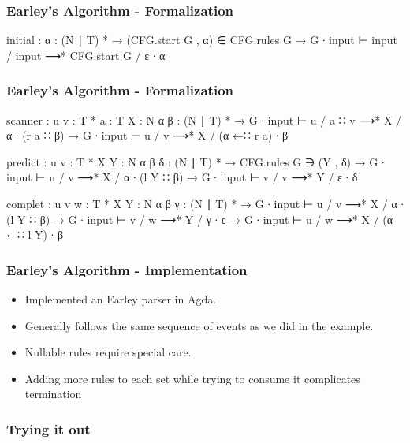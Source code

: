 \begin{frame}
	\frametitle{Earley's Algorithm - Formalization}
	\begin{code}
	  initial : {α : (N ∣ T) *} →
	    (CFG.start G , α) ∈ CFG.rules G →
	    G ∙ input ⊢ input / input ⟶* CFG.start G / ε ∙ α
	\end{code}
\end{frame}

\begin{frame}
	\frametitle{Earley's Algorithm - Formalization}
	\begin{code}
	  scanner : {u v : T *} {a : T} {X : N} {α β : (N ∣ T) *} →
	    G ∙ input ⊢ u / a ∷ v ⟶* X / α ∙ (r a ∷ β) →
	    G ∙ input ⊢ u / v ⟶* X / (α ←∷ r a) ∙ β

	  predict : {u v : T *} {X Y : N} {α β δ : (N ∣ T) *} →
	    CFG.rules G ∋ (Y , δ) →
	    G ∙ input ⊢ u / v ⟶* X / α ∙ (l Y ∷ β) →
	    G ∙ input ⊢ v / v ⟶* Y / ε ∙ δ

	  complet : {u v w : T *} {X Y : N} {α β γ : (N ∣ T) *} →
	    G ∙ input ⊢ u / v ⟶* X / α ∙ (l Y ∷ β) →
	    G ∙ input ⊢ v / w ⟶* Y / γ ∙ ε →
	    G ∙ input ⊢ u / w ⟶* X / (α ←∷ l Y) ∙ β
	\end{code}
\end{frame}

\begin{frame}
	\frametitle{Earley's Algorithm - Implementation}
	\begin{itemize}
		\item Implemented an Earley parser in Agda.
		\item Generally follows the same sequence of events as we did in the 
			example.
		\item Nullable rules require special care.
		\item Adding more rules to each set while trying to consume it
			complicates termination
	\end{itemize}
\end{frame}

\begin{frame}
	\frametitle{Trying it out}
\end{frame}


